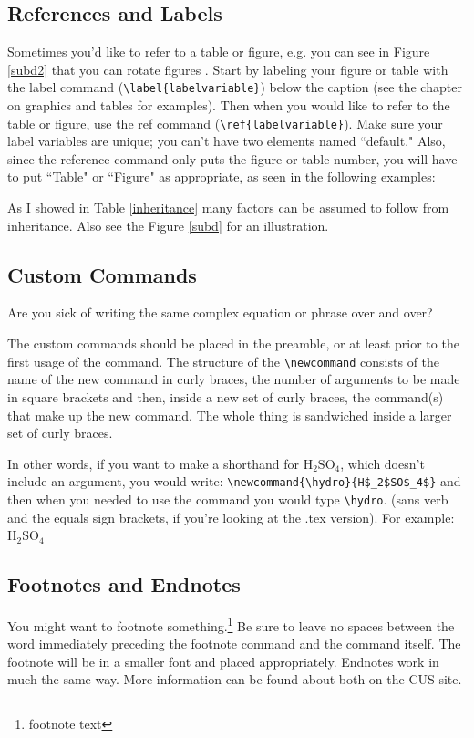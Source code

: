 \documentclass[12pt,twoside]{reedthesis}
\theoremstyle{plain}   %
\theoremstyle{definition}
\theoremstyle{remark}
\numberwithin{equation}{section}
\begin{document}
\subsection{References and Labels}
Sometimes you'd like to refer to a table or figure, e.g. you can see in Figure \ref{subd2} that you can rotate figures . Start by labeling your figure or table with the label command (\verb=\label{labelvariable}=) below the caption (see the chapter on graphics and tables for examples). Then when you would like to refer to the table or figure, use the ref command (\verb=\ref{labelvariable}=). Make sure your label variables are unique; you can't have two elements named ``default." Also, since the reference command only puts the figure or table number, you will have to put  ``Table" or ``Figure" as appropriate, as seen in the following examples:

 As I showed in Table \ref{inheritance} many factors can be assumed to follow from inheritance. Also see the Figure \ref{subd} for an illustration.
 
\subsection{Custom Commands}\label{commands}
Are you sick of writing the same complex equation or phrase over and over? 

The custom commands should be placed in the preamble, or at least prior to the first usage of the command. The structure of the \verb=\newcommand= consists of the name of the new command in curly braces, the number of arguments to be made in square brackets and then, inside a new set of curly braces, the command(s) that make up the new command. The whole thing is sandwiched inside a larger set of curly braces. 

\newcommand{\hydro}{H$_2$SO$_4$}

In other words, if you want to make a shorthand for H$_2$SO$_4$, which doesn't include an argument, you would write: \verb=\newcommand{\hydro}{H$_2$SO$_4$}= and then when you needed  to use the command you would type \verb=\hydro=. (sans verb and the equals sign brackets, if you're looking at the .tex version). For example: \hydro

\subsection{Footnotes and Endnotes}
	You might want to footnote something.\footnote{footnote text} Be sure to leave no spaces between the word immediately preceding the footnote command and the command itself. The footnote will be in a smaller font and placed appropriately. Endnotes work in much the same way. More information can be found about both on the CUS site.
	
\end{document}
